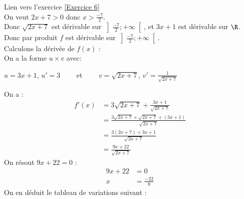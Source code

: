 \documentclass[12pt,fleqn]{report} %
\begin{document}
\begin{correction}Lien vers l'exercice   \ref{Exercice 6}\\
	On veut $2x+7>0$ donc $x>\frac{-7}{2}$.
	\\
	Donc $\sqrt{2x+7}$ est dérivable sur $\left]\frac{-7}{2};+\infty\right[$, et $3x+1$ est dérivable sur $\R$.\\
	Donc par produit $f$ est dérivable sur $\left]\frac{-7}{2};+\infty\right[$.\\	
	Calculons la dérivée de $f(x)$ :\\	
	On a la forme $u\times v$ avec:
	\begin{center}
		$u=3x+1$, $u'=3 \qquad$ et $\qquad v=\sqrt{2x+7}$, $v'=\frac{1}{\sqrt{2x+7}}$
	\end{center}
	
	On a :
	\begin{align*}
	f'(x) & =3\sqrt{2x+7}+\frac{3x+1}{\sqrt{2x+7}}\\ & =\frac{3\sqrt{2x+7}\times \sqrt{2x+7}+(3x+1)}{\sqrt{2x+7}}\\& =\frac{3(2x+7)+3x+1}{\sqrt{2x+7}}\\& =\frac{9x+22}{\sqrt{2x+7}}
	\end{align*}
	On résout $9x+22=0$ :
	\begin{align*}
	9x+22 & =0\\x & =\frac{-22}{9}
	\end{align*}
	On en déduit le tableau de variations suivant :
	\vskip 0.5cm
	\begin{center}
	\end{center}
\end{correction}
\end{document}

